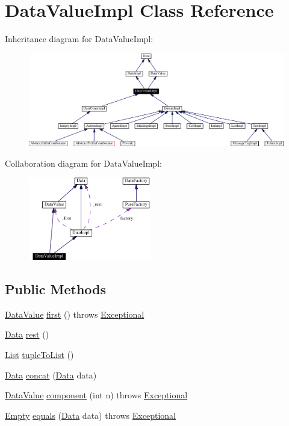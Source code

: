 \hypertarget{classDataValueImpl}{
\section{Data\-Value\-Impl  Class Reference}
\label{classDataValueImpl}
}
Inheritance diagram for Data\-Value\-Impl:\begin{figure}[H]
\begin{center}
\leavevmode
\includegraphics[width=381pt]{classDataValueImpl__inherit__graph}
\end{center}
\end{figure}
Collaboration diagram for Data\-Value\-Impl:\begin{figure}[H]
\begin{center}
\leavevmode
\includegraphics[width=151pt]{classDataValueImpl__coll__graph}
\end{center}
\end{figure}
\subsection*{Public Methods}
\begin{CompactItemize}
\item 
\hyperlink{interfaceDataValue}{Data\-Value} \hyperlink{classDataValueImpl_a0}{first} () throws \hyperlink{classExceptional}{Exceptional}
\item 
\hyperlink{interfaceData}{Data} \hyperlink{classDataValueImpl_a1}{rest} ()
\item 
\hyperlink{interfaceList}{List} \hyperlink{classDataValueImpl_a2}{tuple\-To\-List} ()
\item 
\hyperlink{interfaceData}{Data} \hyperlink{classDataValueImpl_a3}{concat} (\hyperlink{interfaceData}{Data} data)
\item 
\hyperlink{interfaceDataValue}{Data\-Value} \hyperlink{classDataValueImpl_a4}{component} (int n) throws \hyperlink{classExceptional}{Exceptional}
\item 
\hyperlink{interfaceEmpty}{Empty} \hyperlink{classDataValueImpl_a5}{equals} (\hyperlink{interfaceData}{Data} data) throws \hyperlink{classExceptional}{Exceptional}
\end{CompactItemize}
